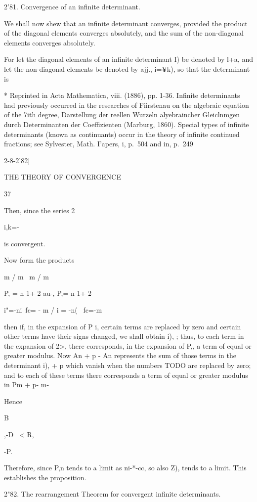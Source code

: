 2'81. Convergence of an infinite determinant.

We shall now shew that an infinite determinant converges, provided the
product of the diagonal elements converges absolutely, and the sum of
the non-diagonal elements converges absolutely.

For let the diagonal elements of an infinite determinant I) be denoted
by l+a, and let the non-diagonal elements be denoted by ajj., i=¥k),
so that the determinant is

* Reprinted in Acta Mathematica, viii. (1886), pp. 1-36. Infinite
determinants had previously occurred in the researches of Fiirstenau
on the algebraic equation of the 7ith degree, Darstellung der reellen
Wurzeln alyebraincher Gleiclnmgen durch Determinanten der
Coeffizienten (Marburg, 1860). Special types of infinite determinants
(known as continuants) occur in the theory of infinite continued
fractions; see Sylvester, Math. I'apers, i, p.~504 and in, p.~249

2-8-2'82]

THE THEORY OF CONVERGENCE

37

Then, since the series  2

i,k=-

is convergent.

Now form the products

m / m \ m / m

P, = n 1+ 2 au-, P,= n 1+ 2

i"=-ni\ fc= - m / i = -n( \ fc=-m

then if, in the expansion of P i, certain terms are replaced by zero
and certain other terms have their signs changed, we shall obtain i),
; thus, to each term in the expansion of 2>, there corresponds, in
the expansion of P,, a term of equal or greater modulus. Now An + p -
An represents the sum of those terms in the determinant i), + p which
vanish when the numbers TODO are replaced by zero; and to each of
these terms there corresponds a term of equal or greater modulus in Pm
+ p- m-

Hence

B

,-D \ < R,

-P.

Therefore, since P,n tends to a limit as ni-*-cc, so also Z), tends
to a limit. This establishes the proposition.

2"82. The rearrangement Theorem for convergent infinite determinants.

